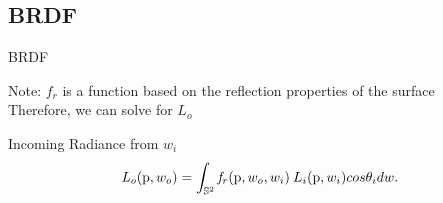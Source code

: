 \documentclass[10pt,compress,professionalfont]{beamer}
\begin{document}
\subsection{BRDF}
\begin{frame}{BRDF}

    {\centering
        Note: $f_r$ is a function based on the reflection properties of the surface \\
        \vspace{4mm}
        Therefore, we can solve for $L_o$\\
    }

    \begin{block}{Incoming Radiance from $w_i$}
    \[
        \mathit{L_o}(\textup{p}, w_o) = \int_{\mathbb{S}^2} \mathit{f_r}(\textup{p}, w_o, w_i)\:L_i(\textup{p}, w_i)cos\theta_i dw.
    \]
    \end{block}

\end{frame}
\end{document}
